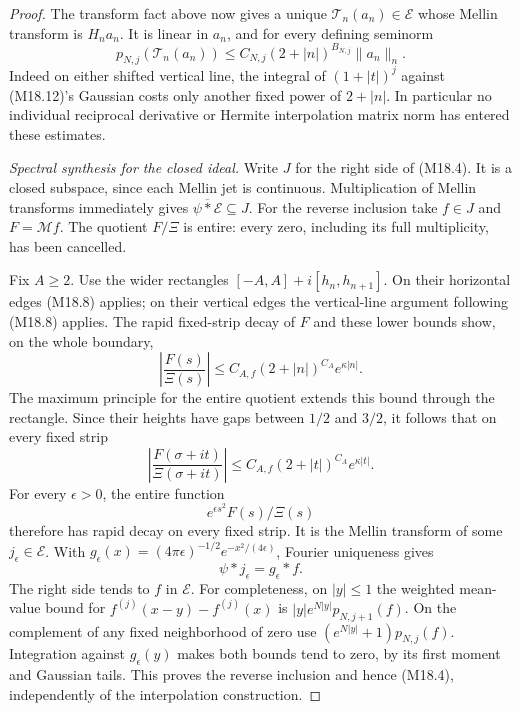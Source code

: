 \documentclass[11pt,a4paper]{article}
\begin{document}
\begin{proof}
The transform fact above now gives a unique
\(\mathcal T_n(a_n)\in\mathcal E\) whose Mellin transform is
\(H_n a_n\).  It is linear in \(a_n\), and for every
defining seminorm
\[
 p_{N,j}(\mathcal T_n(a_n))
       \le C_{N,j}(2+|n|)^{B_{N,j}}\|a_n\|_n .                  \tag{M18.13}
\]
Indeed on either shifted vertical line, the integral
of \((1+|t|)^j\) against (M18.12)'s Gaussian costs
only another fixed power of \(2+|n|\).
In particular no individual reciprocal derivative
or Hermite interpolation matrix norm has entered
these estimates.

\emph{Spectral synthesis for the closed ideal.}
Write \(J\) for the right side of (M18.4).
It is a closed subspace, since each Mellin jet is
continuous.  Multiplication of Mellin transforms
immediately gives
\(\overline{\psi*\mathcal E}\subseteq J\).
For the reverse inclusion take \(f\in J\) and
\(F=\mathcal Mf\).  The quotient \(F/\Xi\) is entire:
every zero, including its full multiplicity, has
been cancelled.

Fix \(A\ge2\).  Use the wider rectangles
\([-A,A]+i[h_n,h_{n+1}]\).  On their horizontal
edges (M18.8) applies; on their vertical edges
the vertical-line argument following (M18.8)
applies.  The rapid fixed-strip decay of \(F\)
and these lower bounds show, on the whole boundary,
\[
 \left|\frac{F(s)}{\Xi(s)}\right|
       \le C_{A,f}(2+|n|)^{C_A}e^{\kappa|n|}.
\]
The maximum principle for the entire quotient
extends this bound through the rectangle.
Since their heights have gaps between \(1/2\)
and \(3/2\), it follows that on every fixed strip
\[
 \left|\frac{F(\sigma+it)}{\Xi(\sigma+it)}\right|
       \le C_{A,f}(2+|t|)^{C_A}e^{\kappa|t|}.                  \tag{M18.14}
\]
For every \(\epsilon>0\), the entire function
\[
                   e^{\epsilon s^2}F(s)/\Xi(s)
\]
therefore has rapid decay on every fixed strip.
It is the Mellin transform of some
\(j_\epsilon\in\mathcal E\).
With \(g_\epsilon(x)=(4\pi\epsilon)^{-1/2}
e^{-x^2/(4\epsilon)}\), Fourier uniqueness gives
\[
                         \psi*j_\epsilon=g_\epsilon*f.
\]
The right side tends to \(f\) in \(\mathcal E\).
For completeness, on \(|y|\le1\) the weighted
mean-value bound for
\(f^{(j)}(x-y)-f^{(j)}(x)\) is
\(|y|e^{N|y|}p_{N,j+1}(f)\).
On the complement of any fixed neighborhood of
zero use
\((e^{N|y|}+1)p_{N,j}(f)\).
Integration against \(g_\epsilon(y)\) makes both
bounds tend to zero, by its first moment and
Gaussian tails.  This proves the reverse inclusion
and hence (M18.4), independently of the interpolation
construction.


\end{proof}
\end{document}
